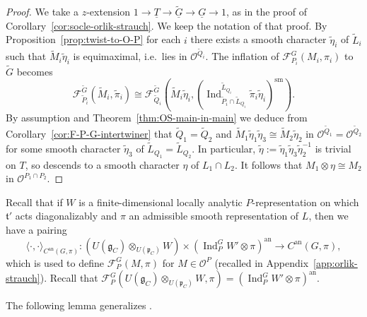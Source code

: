 \documentclass[a4paper]{amsart}
\numberwithin{equation}{section}
\theoremstyle{remark}
\theoremstyle{definition}
\DeclareMathOperator{\Ind}{Ind}
\newcommand{\sm}{\mathrm{sm}}
\newcommand{\alggrp}[1]{\underline{#1}}
\newcommand{\an}{\mathrm{an}}
\newcommand{\ang}[1]{\langle #1\rangle}
\newcommand{\wt}[1]{\widetilde{#1}}
\begin{document}
\begin{proof}
  We take a $z$-extension $1 \to \alggrp T \to \wt {\alggrp G} \to \alggrp G \to 1$, as in the proof of Corollary~\ref{cor:socle-orlik-strauch}.
  We keep the notation of that proof.
  By Proposition~\ref{prop:twist-to-O-P} for each $i$ there exists a smooth character $\wt\eta_i$ of $\wt L_i$ such that $\wt M_i \wt\eta_i$ is equimaximal, i.e.\ lies in $\mathcal O^{\wt Q_i}$.
  The inflation of $\mathcal{F}_{P_i}^G(M_i,\pi_i)$ to $\wt G$ becomes
  \begin{equation*}
    \mathcal{F}_{\wt P_i}^{\wt G}(\wt M_i,\wt\pi_i) \cong \mathcal{F}_{\wt Q_i}^{\wt G}(\wt M_i\wt \eta_i,(\Ind_{\wt P_i \cap \wt L_{Q_i}}^{\wt L_{Q_i}} \wt\pi_i\wt\eta_i)^\sm).
  \end{equation*}
  By assumption and Theorem~\ref{thm:OS-main-in-main} we deduce from Corollary~\ref{cor:F-P-G-intertwiner} that $\wt Q_1 = \wt Q_2$ and $\wt M_1 \wt\eta_1 \wt\eta_3 \cong \wt M_2 \wt\eta_2$ in $\mathcal O^{\wt Q_1} = \mathcal O^{\wt Q_2}$ for some smooth character $\wt\eta_3$ of $\wt L_{Q_1} = \wt L_{Q_2}$.
  In particular, $\wt\eta := \wt\eta_1 \wt\eta_3 \wt\eta_2^{-1}$ is trivial on $T$, so descends to a smooth character $\eta$ of $L_1 \cap L_2$.
  It follows that $M_1 \otimes \eta \cong M_2$ in $\mathcal O^{P_1 \cap P_2}$.
\end{proof}

Recall that if $W$ is a finite-dimensional locally analytic
$P$-representation on which $\mathfrak{t}'$ acts diagonalizably and $\pi$ an admissible smooth representation of $L$, then we have a pairing
\begin{equation*}
  \ang{\cdot,\cdot}_{C^{\an}(G,\pi)} \colon (U(\mathfrak{g}_{C}) \otimes_{U(\mathfrak{p}_{C})} W) \times (\Ind_P^G W' \otimes \pi)^{\an} \to C^{\an}(G,\pi),
\end{equation*}
which is used to define $\mathcal{F}_P^G(M,\pi)$ for $M \in \mathcal{O}^{P}$ \cite[\S 3.8]{OS3} (recalled in Appendix~\ref{app:orlik-strauch}).
Recall that $\mathcal{F}_P^G(U(\mathfrak{g}_{C}) \otimes_{U(\mathfrak{p}_{C})} W,\pi) = (\Ind_P^G W' \otimes \pi)^{\an}$.

The following lemma generalizes \cite[Lemma 3.1]{socle1}. 
\end{document}

